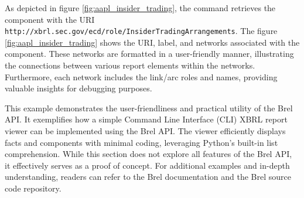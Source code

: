 

As depicted in figure \ref{fig:aapl_insider_trading},  
the command retrieves the component with the URI \texttt{http://xbrl.sec.gov/ecd/role/InsiderTradingArrangements}.  
The figure \ref{fig:aapl_insider_trading} shows the URI, label, and networks associated with the component.  
These networks are formatted in a user-friendly manner,  
illustrating the connections between various report elements within the networks.  
Furthermore, each network includes the link/arc roles and names, providing valuable insights for debugging purposes.

This example demonstrates the user-friendliness and practical utility of the Brel API.  
It exemplifies how a simple Command Line Interface (CLI) XBRL report viewer can be implemented using the Brel API.  
The viewer efficiently displays facts and components with minimal coding, leveraging Python's built-in list comprehension.  
While this section does not explore all features of the Brel API, it effectively serves as a proof of concept.  
For additional examples and in-depth understanding, readers can refer to the Brel documentation\cite{brel_api} and the Brel source code repository\cite{brel_source}.

